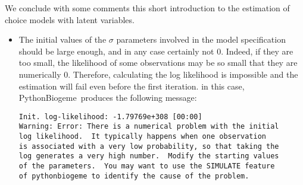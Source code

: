 \documentclass[12pt,a4paper]{article}
\newcommand{\PBIOGEME}{PythonBiogeme}
\begin{document}
We conclude with some comments this short introduction to the estimation of choice models
with latent variables.
\begin{itemize}
\item The initial values of the $\sigma$ parameters involved in the
  model specification should be large enough, and in any case
  certainly not 0. Indeed, if they are too
  small, the likelihood of some observations may be so small that they
  are numerically 0. Therefore, calculating the log likelihood is
  impossible and the estimation will fail even before the first
  iteration. in this case, \PBIOGEME\ produces the following message:
\begin{lstlisting}
Init. log-likelihood: -1.79769e+308 [00:00]
Warning: Error: There is a numerical problem with the initial 
log likelihood.  It typically happens when one observation 
is associated with a very low probability, so that taking the 
log generates a very high number.  Modify the starting values 
of the parameters.  You may want to use the SIMULATE feature 
of pythonbiogeme to identify the cause of the problem.
\end{lstlisting}


\end{itemize}
\end{document}

